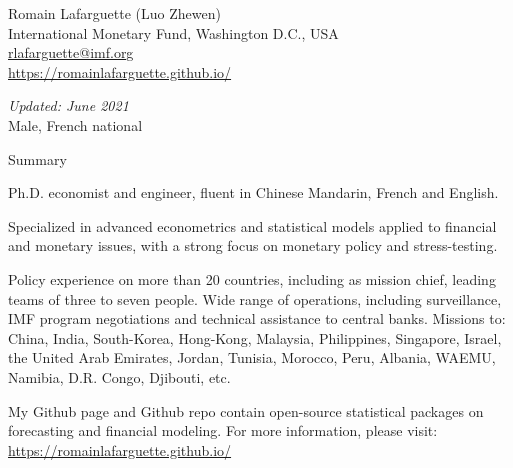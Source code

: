 \documentclass[usegeometry, 10pt, a4paper]{cv} %
\begin{document}
\hspace{10mm}
\begin{chapeau}
\begin{adresse}
\begin{flushleft}
    Romain Lafarguette (Luo Zhewen)\\
    International Monetary Fund, Washington D.C., USA \\
    \href{mailto:rlafarguette@imf.org}{rlafarguette@imf.org}\\
    \url{https://romainlafarguette.github.io/} \\
\end{flushleft}
\end{adresse}
\begin{etatcivil}
\begin{flushleft}
  \emph{Updated: June 2021}\\
Male, French national
\end{flushleft}
\end{etatcivil}
\end{chapeau}


\begin{rubriquetableau}[0.95\textwidth]{Summary}\\
  \vspace{-0.3cm}

\noindent Ph.D. economist and engineer, fluent in Chinese Mandarin, French and English.\\

\smallskip

\noindent Specialized in advanced econometrics and statistical models applied to
financial and monetary issues, with a strong focus on monetary policy and
stress-testing.\\ 

\smallskip

\noindent Policy experience on more than 20 countries, including as mission chief,
leading teams of  three to seven people.  Wide range  of operations, including
surveillance,  IMF program  negotiations and  technical assistance  to central
banks. Missions to: China,   India,  South-Korea,   Hong-Kong,  Malaysia,
Philippines,  Singapore, Israel,  the United  Arab Emirates,  Jordan, Tunisia,
Morocco, Peru, Albania, WAEMU, Namibia, D.R. Congo, Djibouti, etc.\\

\smallskip

\noindent My Github page and Github repo contain open-source statistical packages on
forecasting and financial modeling. For more information, please visit:   
\url{https://romainlafarguette.github.io/} \\

\smallskip
\end{rubriquetableau}
\end{document}

